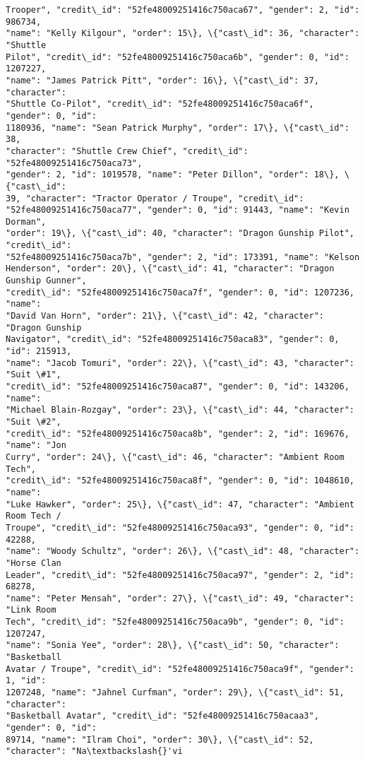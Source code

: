 \documentclass[11pt]{article}
\begin{document}
\begin{tcolorbox}[breakable, size=fbox, boxrule=.5pt, pad at break*=1mm, opacityfill=0]
\begin{Verbatim}[commandchars=\\\{\}]
Trooper", "credit\_id": "52fe48009251416c750aca67", "gender": 2, "id": 986734,
"name": "Kelly Kilgour", "order": 15\}, \{"cast\_id": 36, "character": "Shuttle
Pilot", "credit\_id": "52fe48009251416c750aca6b", "gender": 0, "id": 1207227,
"name": "James Patrick Pitt", "order": 16\}, \{"cast\_id": 37, "character":
"Shuttle Co-Pilot", "credit\_id": "52fe48009251416c750aca6f", "gender": 0, "id":
1180936, "name": "Sean Patrick Murphy", "order": 17\}, \{"cast\_id": 38,
"character": "Shuttle Crew Chief", "credit\_id": "52fe48009251416c750aca73",
"gender": 2, "id": 1019578, "name": "Peter Dillon", "order": 18\}, \{"cast\_id":
39, "character": "Tractor Operator / Troupe", "credit\_id":
"52fe48009251416c750aca77", "gender": 0, "id": 91443, "name": "Kevin Dorman",
"order": 19\}, \{"cast\_id": 40, "character": "Dragon Gunship Pilot", "credit\_id":
"52fe48009251416c750aca7b", "gender": 2, "id": 173391, "name": "Kelson
Henderson", "order": 20\}, \{"cast\_id": 41, "character": "Dragon Gunship Gunner",
"credit\_id": "52fe48009251416c750aca7f", "gender": 0, "id": 1207236, "name":
"David Van Horn", "order": 21\}, \{"cast\_id": 42, "character": "Dragon Gunship
Navigator", "credit\_id": "52fe48009251416c750aca83", "gender": 0, "id": 215913,
"name": "Jacob Tomuri", "order": 22\}, \{"cast\_id": 43, "character": "Suit \#1",
"credit\_id": "52fe48009251416c750aca87", "gender": 0, "id": 143206, "name":
"Michael Blain-Rozgay", "order": 23\}, \{"cast\_id": 44, "character": "Suit \#2",
"credit\_id": "52fe48009251416c750aca8b", "gender": 2, "id": 169676, "name": "Jon
Curry", "order": 24\}, \{"cast\_id": 46, "character": "Ambient Room Tech",
"credit\_id": "52fe48009251416c750aca8f", "gender": 0, "id": 1048610, "name":
"Luke Hawker", "order": 25\}, \{"cast\_id": 47, "character": "Ambient Room Tech /
Troupe", "credit\_id": "52fe48009251416c750aca93", "gender": 0, "id": 42288,
"name": "Woody Schultz", "order": 26\}, \{"cast\_id": 48, "character": "Horse Clan
Leader", "credit\_id": "52fe48009251416c750aca97", "gender": 2, "id": 68278,
"name": "Peter Mensah", "order": 27\}, \{"cast\_id": 49, "character": "Link Room
Tech", "credit\_id": "52fe48009251416c750aca9b", "gender": 0, "id": 1207247,
"name": "Sonia Yee", "order": 28\}, \{"cast\_id": 50, "character": "Basketball
Avatar / Troupe", "credit\_id": "52fe48009251416c750aca9f", "gender": 1, "id":
1207248, "name": "Jahnel Curfman", "order": 29\}, \{"cast\_id": 51, "character":
"Basketball Avatar", "credit\_id": "52fe48009251416c750acaa3", "gender": 0, "id":
89714, "name": "Ilram Choi", "order": 30\}, \{"cast\_id": 52, "character": "Na\textbackslash{}'vi

\end{Verbatim}
\end{tcolorbox}
\end{document}
